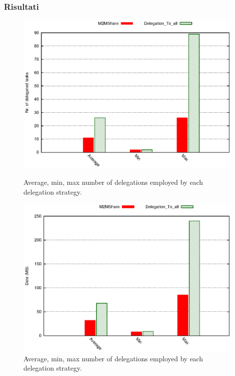 \documentclass{beamer}
\begin{document}
\begin{frame}
\frametitle{Risultati}
\begin{figure}[ht]
\begin{minipage}[b]{0.45\linewidth}
\centering
\includegraphics[scale=0.4]{../grafici/delegheFatte.eps}
\caption{Average, min, max number of delegations employed by each delegation strategy.}
\end{minipage}
\hspace{0.5cm}
\begin{minipage}[b]{0.45\linewidth}
\centering
\pause
\includegraphics[scale=0.4]{../grafici/data.eps}
\caption{Average, min, max number of delegations employed by each delegation strategy.}
\end{minipage}
\end{figure}
\end{frame}
\end{document}
